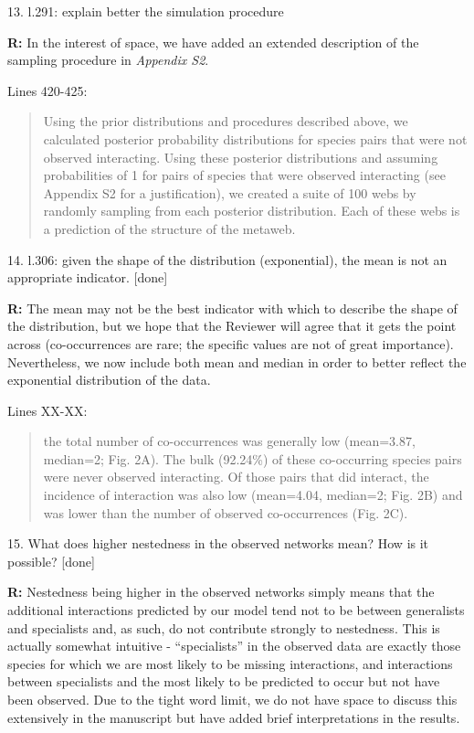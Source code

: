 \documentclass[12pt]{letter}
\begin{document}
	13. l.291: explain better the simulation procedure
	

		\textbf{R:} In the interest of space, we have added an extended description of the sampling procedure in \emph{Appendix S2}. 


		Lines 420-425:


		\begin{quotation}
			Using the prior distributions and procedures described above, we calculated posterior probability distributions for species pairs that were not observed interacting. Using these posterior distributions and assuming probabilities of 1 for pairs of species that were observed interacting (see Appendix S2 for a justification), we created a suite of 100 webs by randomly sampling from each posterior distribution. Each of these webs is a prediction of the structure of the metaweb.
		\end{quotation}


	14. l.306: given the shape of the distribution (exponential), the mean is not an appropriate indicator. [done]


		\textbf{R:} The mean may not be the best indicator with which to describe the shape of the distribution, but we hope that the Reviewer will agree that it gets the point across (co-occurrences are rare; the specific values are not of great importance). Nevertheless, we now include both mean and median in order to better reflect the exponential distribution of the data.


		Lines XX-XX:


		\begin{quotation}
			the total number of co-occurrences was generally low (mean=3.87, median=2; Fig. 2A). The bulk (92.24\%) of these co-occurring species pairs were never observed interacting. Of those pairs that did interact, the incidence of interaction was also low (mean=4.04, median=2; Fig. 2B) and was lower than the number of observed co-occurrences (Fig. 2C).
		\end{quotation}


	15. What does higher nestedness in the observed networks mean? How is it possible? [done]


		\textbf{R:} Nestedness being higher in the observed networks simply means that the additional interactions predicted by our model tend not to be between generalists and specialists and, as such, do not contribute strongly to nestedness. This is actually somewhat intuitive - ``specialists'' in the observed data are exactly those species for which we are most likely to be missing interactions, and interactions between specialists and the most likely to be predicted to occur but not have been observed. Due to the tight word limit, we do not have space to discuss this extensively in the manuscript but have added brief interpretations in the results.
\end{document}
